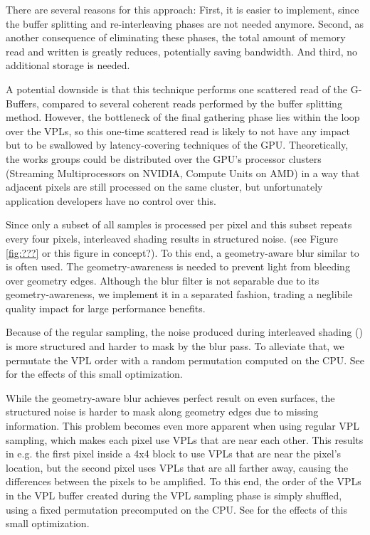 
There are several reasons for this approach: First, it is easier to implement, since the buffer splitting and re-interleaving phases are not needed anymore. Second, as another consequence of eliminating these phases, the total amount of memory read and written is greatly reduces, potentially saving bandwidth. And third, no additional storage is needed.

A potential downside is that this technique performs one scattered read of the G-Buffers, compared to several coherent reads performed by the buffer splitting method. However, the bottleneck of the final gathering phase lies within the loop over the VPLs, so this one-time scattered read is likely to not have any impact but to be swallowed by latency-covering techniques of the GPU. Theoretically, the works groups could be distributed over the GPU's processor clusters (Streaming Multiprocessors on NVIDIA, Compute Units on AMD) in a way that adjacent pixels are still processed on the same cluster, but unfortunately application developers have no control over this.


Since only a subset of all samples is processed per pixel and this subset repeats every four pixels, interleaved shading results in structured noise. (see Figure \ref{fig:???} or this figure in concept?). To this end, a geometry-aware blur similar to \citet{laine2007incremental} is often used. The geometry-awareness is needed to prevent light from bleeding over geometry edges. Although the blur filter is not separable due to its geometry-awareness, we implement it in a separated fashion, trading a neglibile quality impact for large performance benefits.



Because of the regular sampling, the noise produced during interleaved shading () is more structured and harder to mask by the blur pass. To alleviate that, we permutate the VPL order with a random permutation computed on the CPU. See  for the effects of this small optimization.

While the geometry-aware blur achieves perfect result on even surfaces, the structured noise is harder to mask along geometry edges due to missing information. This problem becomes even more apparent when using regular VPL sampling, which makes each pixel use VPLs that are near each other. This results in e.g. the first pixel inside a 4x4 block to use VPLs that are near the pixel's location, but the second pixel uses VPLs that are all farther away, causing the differences between the pixels to be amplified. To this end, the order of the VPLs in the VPL buffer created during the VPL sampling phase is simply shuffled, using a fixed permutation precomputed on the CPU. See  for the effects of this small optimization.



